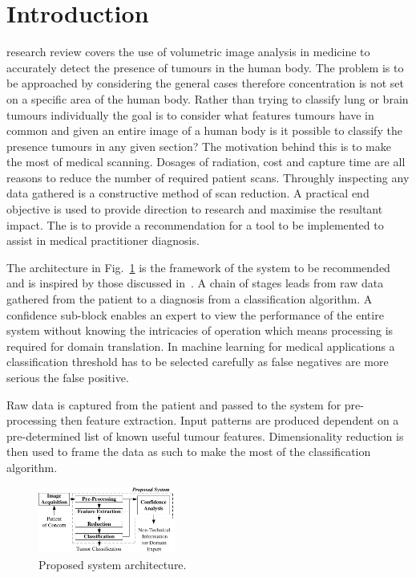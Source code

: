 \documentclass[journal]{IEEEtran}
\begin{document}
\section{Introduction}
 research review covers the use of volumetric image analysis in medicine to accurately detect the presence of tumours in the human body. 
The problem is to be approached by considering the general cases therefore concentration is not set on a specific area of the human body.
Rather than trying to classify lung or brain tumours individually the goal is to consider what features tumours have in common and given an entire image of a human body is it possible to classify the presence tumours in any given section?
The motivation behind this is to make the most of medical scanning.
Dosages of radiation, cost and capture time are all reasons to reduce the number of required patient scans.
Throughly inspecting any data gathered is a constructive method of scan reduction.
A practical end objective is used to provide direction to research and maximise the resultant impact.
The is to provide a recommendation for a tool to be implemented to assist in medical practitioner diagnosis.  

The architecture in Fig.~\ref{fig:Proposed} is the framework of the system to be recommended and is inspired by those discussed in~\cite{ahmed2011efficacy,kumar2011classification,hau07feat,sachdeva2011multiclass,kostis03three}.
A chain of stages leads from raw data gathered from the patient to a diagnosis from a classification algorithm.
A confidence sub-block enables an expert to view the performance of the entire system without knowing the intricacies of operation which means processing is required for domain translation.
In machine learning for medical applications a classification threshold has to be selected carefully as false negatives are more serious the false positive.

Raw data is captured from the patient and passed to the system for pre-processing then feature extraction.
Input patterns are produced dependent on a pre-determined list of known useful tumour features. 
Dimensionality reduction is then used to frame the data as such to make the most of the classification algorithm.

\begin{figure}[!htb]
   \centering
   \includegraphics[width = 0.4\textwidth]{Figures/Proposed.pdf}
   \caption{Proposed system architecture.}
   \label{fig:Proposed}
\end{figure}
\end{document}
